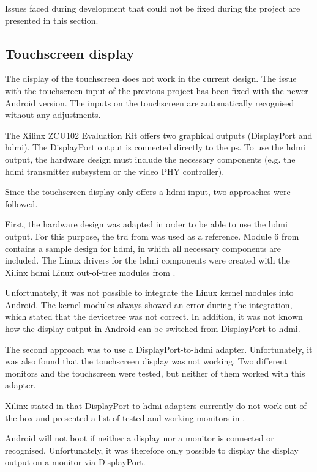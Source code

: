 Issues faced during development that could not be fixed during the project are presented in this section.

\subsection{Touchscreen display}
The display of the touchscreen does not work in the current design. The issue with the touchscreen input of the previous project \cite{oldrepo} has been fixed with the newer Android version. The inputs on the touchscreen are automatically recognised without any adjustments.

The Xilinx ZCU102 Evaluation Kit offers two graphical outputs (DisplayPort and \gls{hdmi}). The DisplayPort output is connected directly to the \gls{ps}. To use the \gls{hdmi} output, the hardware design must include the necessary components (e.g. the \gls{hdmi} transmitter subsystem or the video PHY controller).

Since the touchscreen display only offers a \gls{hdmi} input, two approaches were followed.

First, the hardware design was adapted in order to be able to use the \gls{hdmi} output.
For this purpose, the \gls{trd} from \cite{TRDReferenceDesign} was used as a reference. Module 6 from \cite{TRDReferenceDesign} contains a sample design for \gls{hdmi}, in which all necessary components are included. The Linux drivers for the \gls{hdmi} components were created with the Xilinx \gls{hdmi} Linux out-of-tree modules from \cite{hdmi-modules}. 

Unfortunately, it was not possible to integrate the Linux kernel modules into Android. The kernel modules always showed an error during the integration, which stated that the devicetree was not correct. In addition, it was not known how the display output in Android can be switched from DisplayPort to \gls{hdmi}.

The second approach was to use a DisplayPort-to-\gls{hdmi} adapter. Unfortunately, it was also found that the touchscreen display was not working. Two different monitors and the touchscreen were tested, but neither of them worked with this adapter.

Xilinx stated in \cite{AR67462} that DisplayPort-to-\gls{hdmi} adapters currently do not work out of the box and presented a list of tested and working monitors in \cite{AR68671}.

Android will not boot if neither a display nor a monitor is connected or recognised.
Unfortunately, it was therefore only possible to display the display output on a monitor via DisplayPort.
